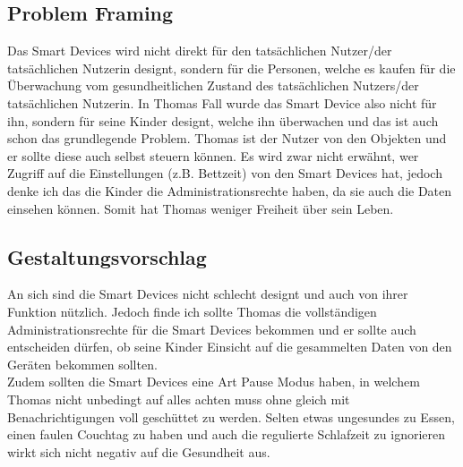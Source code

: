 \subsection{Problem Framing}
Das Smart Devices wird nicht direkt für den tatsächlichen Nutzer/der tatsächlichen Nutzerin designt, sondern für die Personen, welche es kaufen für die Überwachung vom gesundheitlichen Zustand des tatsächlichen Nutzers/der tatsächlichen Nutzerin. In Thomas Fall wurde das Smart Device also nicht für ihn, sondern für seine Kinder designt, welche ihn überwachen und das ist auch schon das grundlegende Problem. Thomas ist der Nutzer von den Objekten und er sollte diese auch selbst steuern können. Es wird zwar nicht erwähnt, wer Zugriff auf die Einstellungen (z.B. Bettzeit) von den Smart Devices hat, jedoch denke ich das die Kinder die Administrationsrechte haben, da sie auch die Daten einsehen können. Somit hat Thomas weniger Freiheit über sein Leben.
\subsection{Gestaltungsvorschlag}
An sich sind die Smart Devices nicht schlecht designt und auch von ihrer Funktion nützlich. Jedoch finde ich sollte Thomas die vollständigen Administrationsrechte für die Smart Devices bekommen und er sollte auch entscheiden dürfen, ob seine Kinder Einsicht auf die gesammelten Daten von den Geräten bekommen sollten. \\
Zudem sollten die Smart Devices eine Art Pause Modus haben, in welchem Thomas nicht unbedingt auf alles achten muss ohne gleich mit Benachrichtigungen voll geschüttet zu werden. Selten etwas ungesundes zu Essen, einen faulen Couchtag zu haben und auch die regulierte Schlafzeit zu ignorieren wirkt sich nicht negativ auf die Gesundheit aus. 
